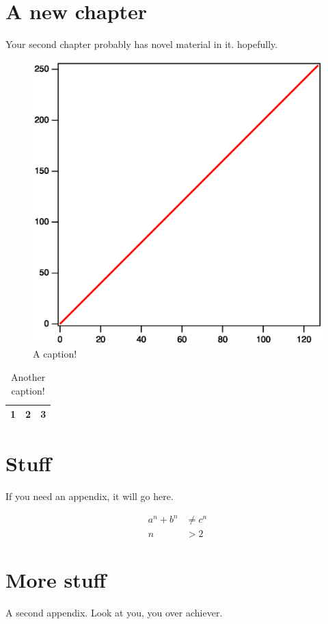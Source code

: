 \documentclass[letterpaper,11pt]{yalephd}
\begin{document}
\chapter{A new chapter}
Your second chapter probably has novel material in it. hopefully.





\begin{figure}[ht]
\centering
\includegraphics[width=.45\textwidth]{name_of_figure.eps}
\caption{A caption! \label{a_figure}}
\end{figure}

\begin{table}
\centering
\begin{tabular}{c|c|c}
 1 & 2 & 3 \\
\hline
\end{tabular}
\caption{Another caption! \label{a_table}}
\end{table}


\appendix

\chapter{Stuff}
If you need an appendix, it will go here.

\begin{align}
a^n + b^n &\ne c^n \\
n &> 2
\end{align}

\chapter{More stuff}
A second appendix. Look at you, you over achiever.

\backmatter


\end{document}

